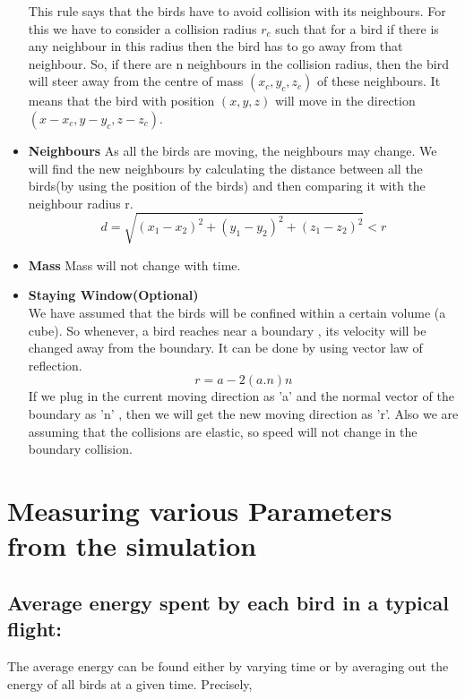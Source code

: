 \documentclass[12pt]{article}
\begin{document}
\begin{itemize}
This rule says that the birds have to avoid collision with its neighbours. For this we have to consider a collision radius $r_c$ such that for a bird if there is any neighbour in this radius then the bird has to go away from that neighbour. So, if there are n neighbours in the collision radius, then the bird will steer away from the centre of mass $(x_c,y_c,z_c)$ of these neighbours. It means that the bird with position $(x,y,z)$ will move in the direction $(x-x_c,y-y_c,z-z_c)$.

\item{} \textbf{Neighbours}
As all the birds are moving, the neighbours may change. We will find the new neighbours by calculating the distance between all the birds(by using the position of the birds) and then comparing it with the neighbour radius r.
$$d = \sqrt{(x_1 - x_2)^2 + (y_1 - y_2)^2 + (z_1 - z_2)^2} < r $$

\item{\textbf{Mass}} Mass will not change with time.

\item{\textbf{Staying Window(Optional)}} \\
We have assumed that the birds will be confined within a certain volume (a cube). So whenever, a bird reaches near a boundary , its velocity will be changed away from the boundary. It can be done by using vector law of reflection.\\
$$r = a - 2(a.n) n$$
If we plug in the current moving direction as 'a' and the normal vector of the boundary as 'n' , then we will get the new moving direction as 'r'. Also we are assuming that the collisions are elastic, so speed will not change in the boundary collision.

\end{itemize}

\pagebreak

\section{Measuring various Parameters from the 
simulation}

\bigskip
\subsection{Average energy spent by each bird in a typical flight:}

The average energy can be found either by varying time or
by averaging out the energy of all birds at a given time. Precisely,
\end{document}
